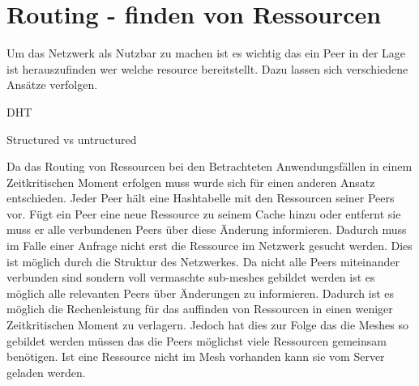 

\section{Routing - finden von Ressourcen}

Um das \pTp Netzwerk als \cdn Nutzbar zu machen ist es wichtig das ein Peer in der Lage ist herauszufinden wer welche resource bereitstellt. Dazu lassen sich verschiedene Ansätze verfolgen.

DHT

Structured vs untructured

Da das Routing von Ressourcen bei den Betrachteten Anwendungsfällen in einem Zeitkritischen Moment erfolgen muss wurde sich für einen anderen Ansatz entschieden. Jeder Peer hält eine Hashtabelle mit den Ressourcen seiner Peers vor. Fügt ein Peer eine neue Ressource zu seinem Cache hinzu oder entfernt sie muss er alle verbundenen Peers über diese Änderung informieren. Dadurch muss im Falle einer Anfrage nicht erst die Ressource im Netzwerk gesucht werden. Dies ist möglich durch die Struktur des Netzwerkes. Da nicht alle Peers miteinander verbunden sind sondern voll vermaschte sub-meshes gebildet werden ist es möglich alle relevanten Peers über Änderungen zu informieren. Dadurch ist es möglich die Rechenleistung für das auffinden von Ressourcen in einen weniger Zeitkritischen Moment zu verlagern. Jedoch hat dies zur Folge das die Meshes so gebildet werden müssen das die Peers möglichst viele Ressourcen gemeinsam benötigen. Ist eine Ressource nicht im Mesh vorhanden kann sie vom Server geladen werden. 

%

%
%


